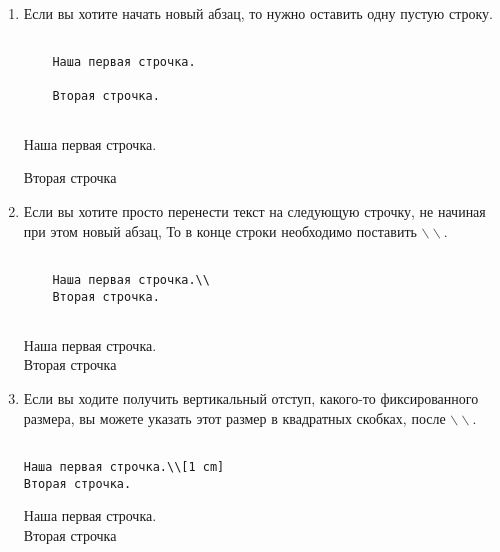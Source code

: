     \begin{enumerate}
        \item Если вы хотите начать новый абзац, то нужно оставить одну пустую строку.

    \begin{minipage}[h!]{0.5\linewidth}
    \begin{verbatim}
    
    Наша первая строчка.

    Вторая строчка.
    
    \end{verbatim}
    \end{minipage}
    \hfill
    \begin{minipage}[h!]{0.5\linewidth}
    Наша первая строчка.

    Вторая строчка
    \end{minipage}

    \item Если вы хотите просто перенести текст на следующую строчку, не начиная при этом новый абзац, То
    в конце строки необходимо поставить $\backslash \backslash$.

    \begin{minipage}[h!]{0.5\linewidth}
    \begin{verbatim}
    
    Наша первая строчка.\\
    Вторая строчка.
    
    \end{verbatim}
    \end{minipage}
    \hfill
    \begin{minipage}[h!]{0.5\linewidth}
    Наша первая строчка.\\
    Вторая строчка
    \end{minipage}

    \item Если вы ходите получить вертикальный отступ, какого-то фиксированного размера,
    вы можете указать этот размер в квадратных скобках, после $\backslash \backslash$.

\begin{minipage}[h!]{0.5\linewidth}
\begin{verbatim}

Наша первая строчка.\\[1 cm]
Вторая строчка.

\end{verbatim}
\end{minipage}
\hfill
\begin{minipage}[h!]{0.5\linewidth}
Наша первая строчка.\\[1 cm]
Вторая строчка
\end{minipage}

    \end{enumerate}

